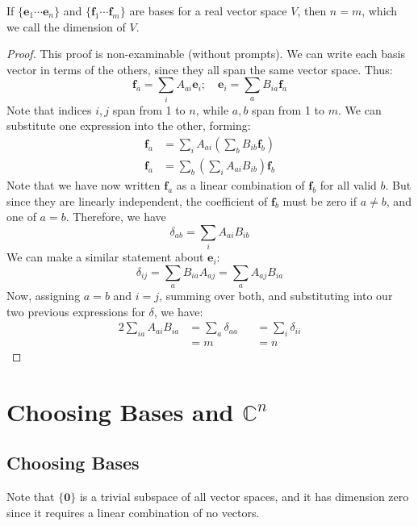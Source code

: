 \documentclass{article}
\begin{document}
	\begin{theorem}
		If $\{\bm e_1 \cdots \bm e_n \}$ and $\{ \bm f_1 \cdots \bm f_m \}$ are bases for a real vector space $V$, then $n=m$, which we call the dimension of $V$.
	\end{theorem}
	\begin{proof}
		This proof is non-examinable (without prompts). We can write each basis vector in terms of the others, since they all span the same vector space. Thus:
		\[ \bm f_a = \sum_i A_{ai} \bm e_i;\quad \bm e_i = \sum_a B_{ia} \bm f_a \]
		Note that indices $i,j$ span from 1 to $n$, while $a,b$ span from 1 to $m$. We can substitute one expression into the other, forming:
		\begin{align*}
			\bm f_a &= \sum_i A_{ai} \left( \sum_b B_{ib}\bm f_b \right) \\
			\bm f_a &= \sum_b \left( \sum_i A_{ai} B_{ib} \right) \bm f_b
		\end{align*}
		Note that we have now written $\bm f_a$ as a linear combination of $\bm f_b$ for all valid $b$. But since they are linearly independent, the coefficient of $\bm f_b$ must be zero if $a \neq b$, and one of $a = b$. Therefore, we have
		\[ \delta_{ab} = \sum_i A_{ai} B_{ib} \]
		We can make a similar statement about $\bm e_i$:
		\[ \delta_{ij} = \sum_a B_{ia} A_{aj} = \sum_a A_{aj} B_{ia} \]
		Now, assigning $a=b$ and $i=j$, summing over both, and substituting into our two previous expressions for $\delta$, we have:
		\begin{alignat}{2}
			\sum_{ia} A_{ai} B_{ia} &= \sum_a \delta_{aa} & &= \sum_i \delta_{ii} \\
			&= m & &= n
		\end{alignat}
	\end{proof}

	\section{Choosing Bases and $\mathbb C^n$}
	\subsection{Choosing Bases}
	Note that $\{ \bm 0 \}$ is a trivial subspace of all vector spaces, and it has dimension zero since it requires a linear combination of no vectors.
\end{document}
